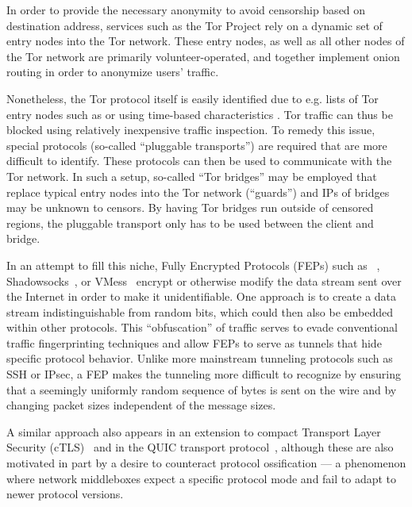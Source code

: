 In order to provide the necessary anonymity to avoid censorship based on destination address, services such as the Tor Project \cite{torproject} rely on a dynamic set of entry nodes into the Tor network. These entry nodes, as well as all other nodes of the Tor network are primarily volunteer-operated, and together implement onion routing in order to anonymize users' traffic.

Nonetheless, the Tor protocol itself is easily identified due to e.g. lists of Tor entry nodes such as \cite{danNodeList} or using time-based characteristics \cite{icissp17}. Tor traffic can thus be blocked using relatively inexpensive traffic inspection. To remedy this issue, special protocols (so-called ``pluggable transports'') are required that are more difficult to identify. These protocols can then be used to communicate with the Tor network. In such a setup, so-called ``Tor bridges'' may be employed that replace typical entry nodes into the Tor network (``guards'') and IPs of bridges may be unknown to censors. By having Tor bridges run outside of censored regions, the pluggable transport only has to be used between the client and bridge.

In an attempt to fill this niche, Fully Encrypted Protocols (FEPs) such as \obfsfour{}~\cite{obfs4}, \textsf{Shadowsocks}~\cite{shadowsocks}, or \textsf{VMess}~\cite{vmess} encrypt or otherwise modify the data stream sent over the Internet in order to make it unidentifiable. One approach is to create a data stream indistinguishable from random bits, which could then also be embedded within other protocols. This ``obfuscation'' of traffic serves to evade conventional traffic fingerprinting techniques and allow FEPs to serve as tunnels that hide specific protocol behavior.
Unlike more mainstream tunneling protocols such as SSH or IPsec, a FEP makes the tunneling more difficult to recognize by ensuring that a seemingly uniformly random sequence of bytes is sent on the wire and by changing packet sizes independent of the message sizes.

A similar approach also appears in an extension to compact Transport Layer Security (cTLS)~\cite{cpbs-pseudorandom-ctls-01} and in the QUIC transport protocol~\cite{rfc9000}, although these are also motivated in part by a desire to counteract protocol ossification --- a phenomenon where network middleboxes expect a specific protocol mode and fail to adapt to newer protocol versions.

